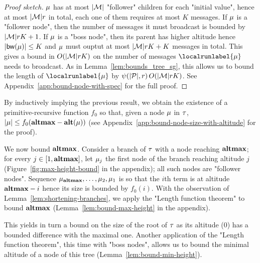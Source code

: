 			

\begin{proof}[Proof sketch]
	$\mu$ has at most $|\mathcal{M}|$ "follower" children for each "initial value", hence at most $|\mathcal{M}|r$ in total, each one of them requires at most $K$ messages. If $\mu$ is a "follower node", then the number of messages it must broadcast is bounded by $|\mathcal{M}| r K +1$. If $\mu$ is a "boss node", then its parent %
	has higher altitude hence $|\mathsf{bw}(\mu)| \leq K$ and $\mu$ must ouptut at most $|\mathcal{M}| r K + K$ messages in total.
	This gives a bound in $O(|\mathcal{M}| r K) $ on the number of messages $\localrunlabel{\node}$ needs to broadcast. As in Lemma~\ref{lem:bounds_tree_sg}, this allows us to bound the length of $\localrunlabel{\node}$ by $\psi(|\mathcal{P}|,r) \, O(|\mathcal{M}| r K)$. See Appendix~\ref{app:bound-node-with-spec} for the full proof.
\end{proof}


By inductively implying the previous result, we obtain the existence of a primitive-recursive function $f_0$ so that, given a node $\mu$ in $\tau$, $|\mu| \leq f_0(\mathbf{altmax} - \mathbf{alt}(\mu))$ (see Appendix~\ref{app:bound-node-size-with-altitude} for the proof).

We now bound $\mathbf{altmax}$. Consider a branch of $\tau$ with a node reaching $\mathbf{altmax}$; for every $j \in [1,\mathbf{altmax}]$, let $\mu_{j}$ the first node of the branch reaching altitude $j$ (Figure~\ref{fig:max-height-bound} in the appendix); all such nodes are "follower nodes". Sequence $\mu_{\mathbf{altmax}}, \dots, \mu_2, \mu_1$ is so that the $i$th term is at altitude $\mathbf{altmax}-i$ hence its size is bounded by $f_0(i)$. With the observation of Lemma~\ref{lem:shortening-branches}, we apply the "Length function theorem" to bound $\mathbf{altmax}$ (Lemma~\ref{lem:bound-max-height} in the appendix).

This yields in turn a bound on the size of the root of $\tau$ as its altitude ($0$) has a bounded difference with the maximal one. Another application of the "Length function theorem", this time with "boss nodes", allows us to bound the minimal altitude of a node of this tree (Lemma~\ref{lem:bound-min-height}).
	
